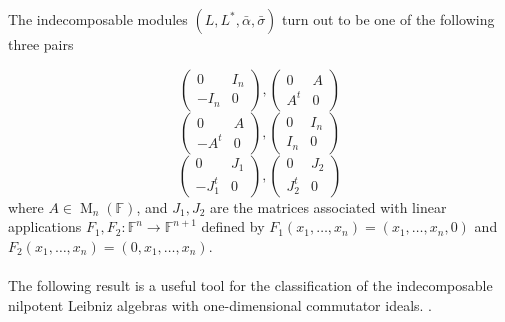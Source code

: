 \documentclass[english,4paper,10pt]{article}
\newcommand{\F}{\mathbb{F}}
\begin{document}
The indecomposable modules $\left(L,L^*,\bar{\alpha},\bar{\sigma}\right)$ turn out to be one of the following three pairs

\begin{equation}\label{modulo1}
 \begin{pmatrix}
 	0 & I_n \\ -I_n & 0
 \end{pmatrix},
\begin{pmatrix}
	0 & A \\ A^t & 0  
\end{pmatrix}
\end{equation}
\begin{equation}\label{modulo2}
\begin{pmatrix}
	0 & A \\ -A^t & 0
\end{pmatrix},
\begin{pmatrix}
	0 & I_n \\ I_n & 0  
\end{pmatrix}
\end{equation}
\begin{equation}\label{modulo3}
\begin{pmatrix}
	0 & J_1 \\ -J_1^t & 0
\end{pmatrix},
\begin{pmatrix}
	0 & J_2 \\ J_2^t & 0  
\end{pmatrix}
\end{equation}
where $A\in \operatorname{M}_n(\F)$, and $J_1,J_2$ are the matrices associated with linear applications $F_1,F_2\colon \F^n\rightarrow \F^{n+1}$ defined by $F_1(x_1,\ldots,x_n)=(x_1,\ldots,x_n,0)$ and $F_2(x_1,\ldots,x_n)=(0,x_1,\ldots,x_n)$.\\ \\
The following result is a useful tool for the classification of the indecomposable nilpotent Leibniz algebras with one-dimensional commutator ideals. .
\end{document}
